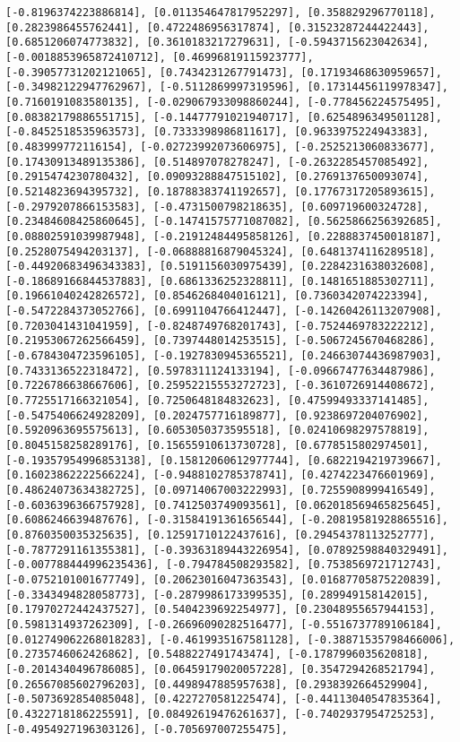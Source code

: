 \documentclass[11pt]{article}
\begin{document}
\begin{Verbatim}[commandchars=\\\{\}]
[-0.8196374223886814], [0.011354647817952297], [0.358829296770118], [0.2823986455762441], [0.4722486956317874], [0.31523287244422443], [0.6851206074773832], [0.3610183217279631], [-0.5943715623042634], [-0.0018853965872410712], [0.46996819115923777], [-0.39057731202121065], [0.7434231267791473], [0.17193468630959657], [-0.34982122947762967], [-0.5112869997319596], [0.17314456119978347], [0.7160191083580135], [-0.029067933098860244], [-0.778456224575495], [0.08382179886551715], [-0.14477791021940717], [0.6254896349501128], [-0.8452518535963573], [0.7333398986811617], [0.9633975224943383], [0.483999772116154], [-0.02723992073606975], [-0.2525213060833677], [0.17430913489135386], [0.514897078278247], [-0.2632285457085492], [0.2915474230780432], [0.09093288847515102], [0.2769137650093074], [0.5214823694395732], [0.18788383741192657], [0.17767317205893615], [-0.2979207866153583], [-0.4731500798218635], [0.609719600324728], [0.23484608425860645], [-0.14741575771087082], [0.5625866256392685], [0.08802591039987948], [-0.21912484495858126], [0.2288837450018187], [0.2528075494203137], [-0.06888816879045324], [0.6481374116289518], [-0.44920683496343383], [0.5191156030975439], [0.2284231638032608], [-0.18689166844537883], [0.6861336252328811], [0.1481651885302711], [0.19661040242826572], [0.8546268404016121], [0.7360342074223394], [-0.5472284373052766], [0.6991104766412447], [-0.14260426113207908], [0.7203041431041959], [-0.8248749768201743], [-0.7524469783222212], [0.21953067262566459], [0.7397448014253515], [-0.5067245670468286], [-0.6784304723596105], [-0.1927830945365521], [0.24663074436987903], [0.7433136522318472], [0.5978311124133194], [-0.09667477634487986], [0.7226786638667606], [0.25952215553272723], [-0.3610726914408672], [0.7725517166321054], [0.7250648184832623], [0.47599493337141485], [-0.5475406624928209], [0.2024757716189877], [0.9238697204076902], [0.5920963695575613], [0.6053050373595518], [0.02410698297578819], [0.8045158258289176], [0.15655910613730728], [0.6778515802974501], [-0.19357954996853138], [0.15812060612977744], [0.6822194219739667], [0.16023862222566224], [-0.9488102785378741], [0.4274223476601969], [0.48624073634382725], [0.09714067003222993], [0.7255908999416549], [-0.6036396366757928], [0.7412503749093561], [0.062018569465825645], [0.6086246639487676], [-0.31584191361656544], [-0.20819581928865516], [0.8760350035325635], [0.12591710122437616], [0.29454378113252777], [-0.7877291161355381], [-0.39363189443226954], [0.07892598840329491], [-0.007788444996235436], [-0.794784508293582], [0.7538569721712743], [-0.0752101001677749], [0.20623016047363543], [0.01687705875220839], [-0.3343494828058773], [-0.2879986173399535], [0.289949158142015], [0.17970272442437527], [0.5404239692254977], [0.23048955657944153], [0.5981314937262309], [-0.26696090282516477], [-0.5516737789106184], [0.012749062268018283], [-0.4619935167581128], [-0.38871535798466006], [0.2735746062426862], [0.5488227491743474], [-0.1787996035620818], [-0.2014340496786085], [0.06459179020057228], [0.3547294268521794], [0.26567085602796203], [0.4498947885957638], [0.2938392664529904], [-0.5073692854085048], [0.4227270581225474], [-0.44113040547835364], [0.4322718186225591], [0.08492619476261637], [-0.7402937954725253], [-0.4954927196303126], [-0.705697007255475], 
\end{Verbatim}
\end{document}
